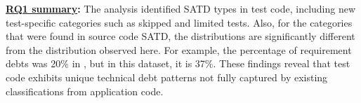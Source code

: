 
\begin{tcolorbox}
\noindent\textbf{\underline{RQ1 summary}:}
The analysis identified \categoryCount{} SATD types in test code, including \newCategoryCount{} new test-specific categories such as skipped and limited tests. Also, for the categories that were found in source code SATD, the distributions are significantly different from the distribution observed here. For example, the percentage of requirement debts was 20\% in \cite{bavota_large-scale_2016}, but in this dataset, it is 37\%. These findings reveal that test code exhibits unique technical debt patterns not fully captured by existing classifications from application code.
\end{tcolorbox}
